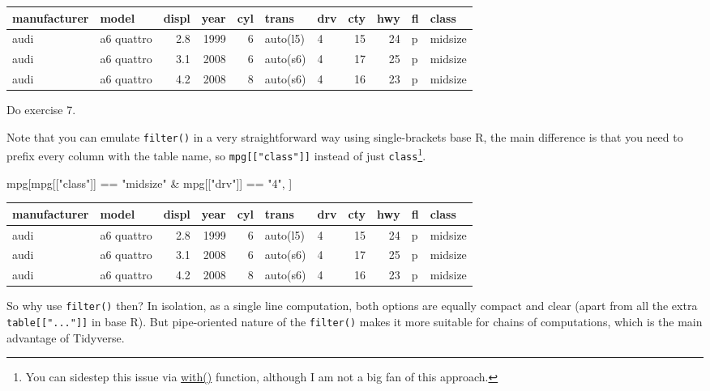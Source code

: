 \documentclass[
]{book}
\newenvironment{Shaded}{\begin{snugshade}}{\end{snugshade}}
\newcommand{\NormalTok}[1]{#1}
\newcommand{\SpecialCharTok}[1]{\textcolor[rgb]{0.00,0.00,0.00}{#1}}
\newcommand{\StringTok}[1]{\textcolor[rgb]{0.31,0.60,0.02}{#1}}
\begin{document}
\begin{tabular}{l|l|r|r|r|l|l|r|r|l|l}
\hline
manufacturer & model & displ & year & cyl & trans & drv & cty & hwy & fl & class\\
\hline
audi & a6 quattro & 2.8 & 1999 & 6 & auto(l5) & 4 & 15 & 24 & p & midsize\\
\hline
audi & a6 quattro & 3.1 & 2008 & 6 & auto(s6) & 4 & 17 & 25 & p & midsize\\
\hline
audi & a6 quattro & 4.2 & 2008 & 8 & auto(s6) & 4 & 16 & 23 & p & midsize\\
\hline
\end{tabular}

Do exercise 7.

Note that you can emulate \texttt{filter()} in a very straightforward way using single-brackets base R, the main difference is that you need to prefix every column with the table name, so \texttt{mpg{[}{[}"class"{]}{]}} instead of just \texttt{class}\footnote{You can sidestep this issue via \href{https://stat.ethz.ch/R-manual/R-devel/library/base/html/with.html}{with()} function, although I am not a big fan of this approach.}.

\begin{Shaded}
\begin{Highlighting}[]
\NormalTok{mpg[mpg[[}\StringTok{"class"}\NormalTok{]] }\SpecialCharTok{==} \StringTok{"midsize"} \SpecialCharTok{\&}\NormalTok{ mpg[[}\StringTok{"drv"}\NormalTok{]] }\SpecialCharTok{==} \StringTok{"4"}\NormalTok{, ]}
\end{Highlighting}
\end{Shaded}

\begin{tabular}{l|l|r|r|r|l|l|r|r|l|l}
\hline
manufacturer & model & displ & year & cyl & trans & drv & cty & hwy & fl & class\\
\hline
audi & a6 quattro & 2.8 & 1999 & 6 & auto(l5) & 4 & 15 & 24 & p & midsize\\
\hline
audi & a6 quattro & 3.1 & 2008 & 6 & auto(s6) & 4 & 17 & 25 & p & midsize\\
\hline
audi & a6 quattro & 4.2 & 2008 & 8 & auto(s6) & 4 & 16 & 23 & p & midsize\\
\hline
\end{tabular}

So why use \texttt{filter()} then? In isolation, as a single line computation, both options are equally compact and clear (apart from all the extra \texttt{table{[}{[}"..."{]}{]}} in base R). But pipe-oriented nature of the \texttt{filter()} makes it more suitable for chains of computations, which is the main advantage of Tidyverse.
\end{document}
